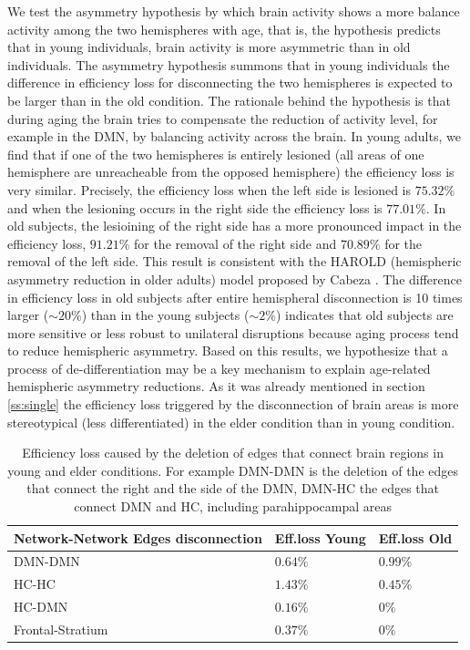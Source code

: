 \documentclass[12pt,a4paper]{article}
\begin{document}
We test the asymmetry hypothesis by which brain activity shows a more balance activity among the two hemispheres with age, that is, the hypothesis predicts that in young individuals, brain activity is more asymmetric than in old individuals. The asymmetry hypothesis summons that in young individuals the difference in efficiency loss for disconnecting the two hemispheres is expected to be larger than in the old condition. The rationale behind the hypothesis is that during aging the brain tries to compensate the reduction of activity level, for example in the DMN, by balancing activity across the brain. 
In young adults, we find that if one of the two hemispheres is entirely lesioned (all areas of one hemisphere are unreacheable from the opposed hemisphere) the efficiency loss is very similar. Precisely, the efficiency loss  when the left side is lesioned is $75.32\%$ and when the lesioning occurs in the right side the efficiency loss is $77.01\%$. 
In old subjects, the lesioining of the right side has a more pronounced impact in the efficiency loss, $91.21\%$ for the removal of the right side and $70.89\%$ for the removal of the left side. 
This result is consistent with the HAROLD (hemispheric asymmetry reduction in older adults) model proposed by  
Cabeza \cite{cabeza_aging_2002}. The difference in efficiency loss in old subjects after entire hemispheral disconnection 
is 10 times larger ($\sim 20\%$) than in the young subjects ($\sim 2\%$) indicates that old subjects are more sensitive or less robust to unilateral disruptions because aging process tend to reduce hemispheric asymmetry.
Based on this results, we hypothesize that a process of de-differentiation may be a key mechanism to explain age-related hemispheric asymmetry reductions. As it was already mentioned in section \ref{ss:single}  the efficiency loss triggered by the disconnection of brain areas is more stereotypical (less differentiated) in the elder condition than in young condition.

\begin{table}[!htbp]
\centering%
\caption{Efficiency loss caused by the deletion of edges that connect brain regions in young and elder conditions. For example DMN-DMN is the deletion of the edges that connect the right and the side of the DMN, DMN-HC the edges that connect DMN and HC, including parahippocampal areas}
\begin{tabularx}{\linewidth}{XXX}
\toprule
Network-Network Edges disconnection & Eff.loss Young & Eff.loss Old\\
\midrule
\midrule
DMN-DMN & $0.64\%$& $0.99\%$\\
\midrule
HC-HC & $1.43\%$& $0.45\%$\\
\midrule
HC-DMN & $0.16\%$& $0\%$\\
\midrule
Frontal-Stratium & $0.37\%$& $0\%$\\
\bottomrule
\end{tabularx}
\label{tab:edges}
\end{table}
\end{document}
